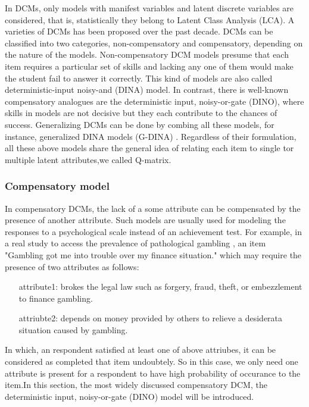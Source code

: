 \documentclass[11pt]{article}
\begin{document}
In DCMs, only models with manifest variables and latent discrete variables are considered, that is, statistically they belong to Latent Class Analysis (LCA). A varieties of DCMs has been proposed over the past decade. DCMs can be classified into two categories, non-compensatory and compensatory, depending on the nature of the models. Non-compensatory DCM models presume that each item requires a particular set of skills and lacking any one of them would make the student fail to answer it correctly. This kind of models are also called deterministic-input noisy-and (DINA) model\cite{de2009dina}. In contrast, there is well-known compensatory analogues are the deterministic input, noisy-or-gate (DINO)\cite{templin2006measurement}, where skills in models are not decisive but they each contribute to the chances of success. Generalizing DCMs can be done by combing all these models, for instance,  generalized DINA models (G-DINA) \cite{de2011generalized}. Regardless of their formulation, all these above models share the general idea of relating each item to single tor multiple latent attributes,we called Q-matrix.
\subsubsection{Compensatory model}

 In compensatory DCMs, the lack of a some attribute can be
compensated by the presence of another attribute. Such models are usually
used for modeling the responses to a psychological scale instead of an achievement test.
For example, in a real study to access the prevalence of pathological gambling \cite{templin2010diagnostic}, an item "Gambling got me into trouble over my finance
situation." which may require the presence of two attributes as follows:
\begin{itemize}
	\item[attribute1:] brokes the legal law such as forgery, fraud, theft, or embezzlement to finance gambling.
	\item[attriubte2:] depends on money provided by others to relieve a desiderata situation caused by gambling.	
\end{itemize}

 
In which, an respondent satisfied at least one of above attriubes, it can be considered as completed that item undoubtely. So in this case, we only need one attribute is present for a respondent to have high probability of occurance to the item.In this section, the most widely discussed compensatory DCM, the deterministic input, noisy-or-gate (DINO) model \cite{templin2006measurement} will be introduced. 
\end{document}
